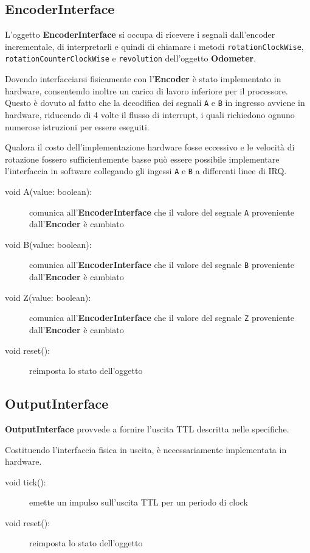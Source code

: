 \documentclass [11pt,a4paper,oneside]{paper}
\newcommand{\component}[1]{\textbf{#1}}
\newcommand{\identifier}[1]{\texttt{#1}}
\begin{document}
\subsection{EncoderInterface}
L'oggetto \component{EncoderInterface} si occupa di ricevere i segnali
dall'encoder incrementale, di interpretarli e quindi di chiamare i
metodi \identifier{rotationClockWise}, \identifier{rotationCounterClockWise}
e \identifier{revolution} dell'oggetto \component{Odometer}.

Dovendo interfacciarsi fisicamente con l'\component{Encoder} è stato
implementato in hardware, consentendo inoltre un carico di lavoro
inferiore per il processore. Questo è dovuto al fatto che la
decodifica dei segnali \identifier{A} e \identifier{B}
in ingresso avviene in hardware, riducendo di 4 volte il flusso di
interrupt, i quali richiedono ognuno numerose istruzioni per
essere eseguiti.

Qualora il costo dell'implementazione hardware fosse eccessivo e
le velocità di rotazione fossero sufficientemente basse può essere
possibile implementare l'interfaccia in software collegando gli
ingessi \identifier{A} e \identifier{B} a differenti linee di IRQ.

\begin{description}
\item[void A(value: boolean):] comunica all'\component{EncoderInterface} che
    il valore del segnale \identifier{A} proveniente dall'\component{Encoder}
    è cambiato
\item[void B(value: boolean):] comunica all'\component{EncoderInterface} che
    il valore del segnale \identifier{B} proveniente dall'\component{Encoder}
    è cambiato
\item[void Z(value: boolean):] comunica all'\component{EncoderInterface} che
    il valore del segnale \identifier{Z} proveniente dall'\component{Encoder}
    è cambiato
\item[void reset():] reimposta lo stato dell'oggetto
\end{description}

\subsection{OutputInterface}
\component{OutputInterface} provvede a fornire l'uscita TTL descritta nelle
specifiche.

Costituendo l'interfaccia fisica in uscita, è necessariamente implementata in
hardware.

\begin{description}
\item[void tick():] emette un impulso sull'uscita TTL per un periodo di clock
\item[void reset():] reimposta lo stato dell'oggetto
\end{description}
\end{document}

